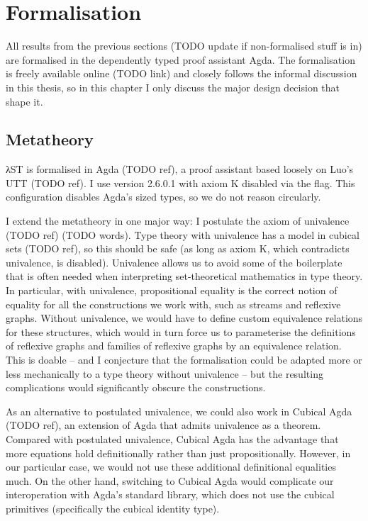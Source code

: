 \chapter{Formalisation}
\label{sec:formalisation}

All results from the previous sections (TODO update if non-formalised stuff is
in) are formalised in the dependently typed proof assistant Agda. The
formalisation is freely available online (TODO link) and closely follows the
informal discussion in this thesis, so in this chapter I only discuss the major
design decision that shape it.


\section{Metatheory}
\label{sec:formalisation:metatheory}

λST is formalised in Agda (TODO ref), a proof assistant based loosely on Luo's
UTT (TODO ref). I use version 2.6.0.1 with axiom K disabled via the
 flag. This configuration disables Agda's sized types, so we
do not reason circularly.

I extend the metatheory in one major way: I postulate the axiom of univalence
(TODO ref) (TODO words). Type theory with univalence has a model in cubical sets
(TODO ref), so this should be safe (as long as axiom K, which contradicts
univalence, is disabled). Univalence allows us to avoid some of the boilerplate
that is often needed when interpreting set-theoretical mathematics in type
theory. In particular, with univalence, propositional equality is the correct
notion of equality for all the constructions we work with, such as streams and
reflexive graphs. Without univalence, we would have to define custom equivalence
relations for these structures, which would in turn force us to parameterise the
definitions of reflexive graphs and families of reflexive graphs by an
equivalence relation. This is doable -- and I conjecture that the formalisation
could be adapted more or less mechanically to a type theory without univalence
-- but the resulting complications would significantly obscure the
constructions.

As an alternative to postulated univalence, we could also work in Cubical Agda
(TODO ref), an extension of Agda that admits univalence as a theorem. Compared
with postulated univalence, Cubical Agda has the advantage that more equations
hold definitionally rather than just propositionally. However, in our particular
case, we would not use these additional definitional equalities much. On the
other hand, switching to Cubical Agda would complicate our interoperation with
Agda's standard library, which does not use the cubical primitives (specifically
the cubical identity type).


